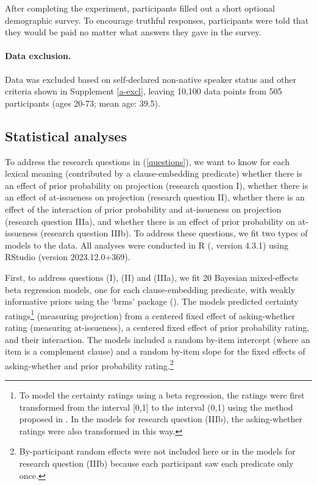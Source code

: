 \documentclass[11pt,fleqn]{article}
\newcommand{\6}{\mbox{$[\hspace*{-.6mm}[$}}
\newcommand{\9}{\mbox{$]\hspace*{-.6mm}]$}}
\begin{document}
After completing the experiment, participants filled out a short optional demographic survey. To encourage truthful responses, participants were told that they would be paid no matter what answers they gave in the survey.

\paragraph{Data exclusion.} Data was excluded based on self-declared non-native speaker status and other criteria shown in Supplement \ref{a-excl}, leaving 10,100 data points from 505 participants (ages 20-73; mean age: 39.5).

\subsection{Statistical analyses}\label{s:stats1}

To address the research questions in (\ref{questions}), we want to know for each lexical meaning (contributed by a clause-embedding predicate) whether there is an effect of prior probability on projection (research question I), whether there is an effect of at-issueness on projection (research question II), whether there is an effect of the interaction of prior probability and at-issueness on projection (research question IIIa), and whether there is an effect of prior probability on at-issueness (research question IIIb). To address these questions, we fit two types of models to the data. All analyses were conducted in R (\citealt{R}, version 4.3.1) using RStudio (version 2023.12.0+369).

First, to address questions (I), (II) and (IIIa), we fit 20 Bayesian mixed-effects beta regression models, one for each clause-embedding predicate, with weakly informative priors using the `brms' package (\citealt{buerkner2017}). The models predicted certainty ratings\footnote{To model the certainty ratings using a beta regression, the ratings were first transformed from the interval [0,1] to the interval (0,1) using the method proposed in \citealt{smithson-verkuilen2006}. In the models for research question (IIIb), the asking-whether ratings were also transformed in this way.} (measuring projection) from a centered fixed effect of asking-whether rating (measuring at-issueness), a centered fixed effect of prior probability rating, and their interaction.  The models included a random by-item intercept (where an item is a complement clause) and a random by-item slope for the fixed effects of asking-whether and prior probability rating.\footnote{By-participant random effects were not included here or in the models for research question (IIIb) because each participant saw each predicate only once.} 
\end{document}

